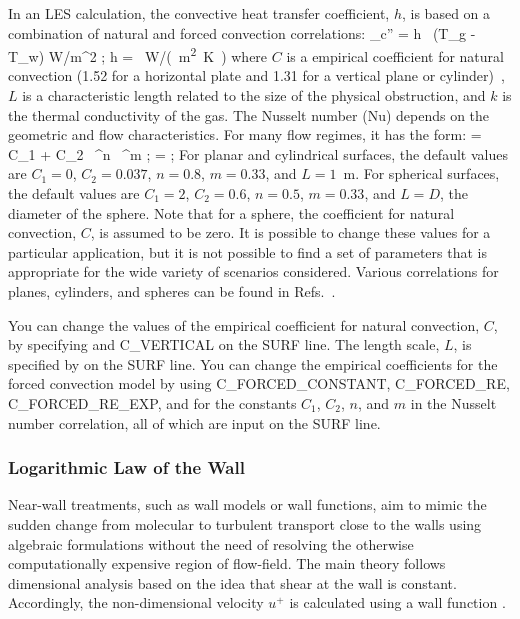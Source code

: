 \documentclass[11pt]{book}
\begin{document}
In an LES calculation, the convective heat transfer coefficient, $h$, is based on a combination of natural and forced convection correlations:
\be \dq_{\rm c}'' = h \, (T_{\rm g} - T_{\rm w}) \quad \hbox{W/m}^2 \quad ; \quad h =
    \max \,   \quad  \si{W/(m^2.K)}
\ee
where $C$ is a empirical coefficient for natural convection (1.52 for a horizontal plate and 1.31 for a vertical plane or cylinder)~\cite{Holman:1}, $L$ is a characteristic length related to the size of the physical obstruction, and $k$ is the thermal conductivity of the gas. The Nusselt number (Nu) depends on the geometric and flow characteristics. For many flow regimes, it has the form:
\be
   \NU = C_1 + C_2 \, \RE^n \, \PR^m  \quad ; \quad \RE =  \quad ; \quad \PR {}
\ee
For planar and cylindrical surfaces, the default values are $C_1=0$, $C_2=0.037$, $n=0.8$, $m=0.33$, and $L=1$~m. For spherical surfaces, the default values are $C_1=2$, $C_2=0.6$, $n=0.5$, $m=0.33$, and $L=D$, the diameter of the sphere. Note that for a sphere, the coefficient for natural convection, $C$, is assumed to be zero. It is possible to change these values for a particular application, but it is not possible to find a set of parameters that is appropriate for the wide variety of scenarios considered. Various correlations for planes, cylinders, and spheres can be found in Refs.~\cite{Holman:1,Incropera:1}.

You can change the values of the empirical coefficient for natural convection, $C$, by specifying  and {\ct C\_VERTICAL} on the {\ct SURF} line. The length scale, $L$, is specified by  on the {\ct SURF} line. You can change the empirical coefficients for the forced convection model by using {\ct C\_FORCED\_CONSTANT}, {\ct C\_FORCED\_RE}, {\ct C\_FORCED\_RE\_EXP}, and  for the constants $C_1$, $C_2$, $n$, and $m$ in the Nusselt number correlation, all of which are input on the {\ct SURF} line.

\subsubsection{Logarithmic Law of the Wall}

Near-wall treatments, such as wall models or wall functions, aim to mimic the sudden change from molecular to turbulent transport close to the walls using algebraic formulations without the need of resolving the otherwise computationally expensive region of flow-field. The main theory follows dimensional analysis based on the idea that shear at the wall is constant. Accordingly, the non-dimensional velocity $u^+$ is calculated using a wall function \cite{FDS_Tech_Guide}.
\end{document}
